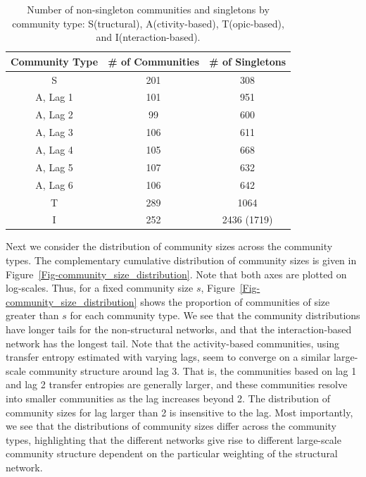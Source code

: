 \begin{table}[ht]
	\caption{Number of non-singleton communities and singletons by community type: S(tructural), A(ctivity-based), T(opic-based), and I(nteraction-based).}
	\centering
	\begin{tabular}{| c | c | c |}
		\hline Community Type & \# of Communities & \# of Singletons \\ \hline
		S & 201 & 308 \\
		A, Lag 1 & 101 & 951 \\
		A, Lag 2 & 99 & 600 \\
		A, Lag 3 & 106 & 611 \\
		A, Lag 4 & 105 & 668 \\
		A, Lag 5 & 107 & 632 \\
		A, Lag 6 & 106 & 642 \\
		T & 289 & 1064 \\
		I & 252 & 2436 (1719) \\ \hline
	\end{tabular}
	\label{Table-comm_count}
\end{table}

Next we consider the distribution of community sizes across the community types. The complementary cumulative distribution of community sizes is given in Figure~\ref{Fig-community_size_distribution}. Note that both axes are plotted on log-scales. Thus, for a fixed community size $s$, Figure~\ref{Fig-community_size_distribution} shows the proportion of communities of size greater than $s$ for each community type. We see that the community distributions have longer tails for the non-structural networks, and that the interaction-based network has the longest tail.
Note that the activity-based communities, using transfer entropy estimated with varying lags, seem to converge on a similar large-scale community structure around lag 3. That is, the communities based on lag 1 and lag 2 transfer entropies are generally larger, and these communities resolve into smaller communities as the lag increases beyond 2. The distribution of community sizes for lag larger than 2 is insensitive to the lag.
Most importantly, we see that the distributions of community sizes differ across the community types, highlighting that the different networks give rise to different large-scale community structure dependent on the particular weighting of the structural network.


